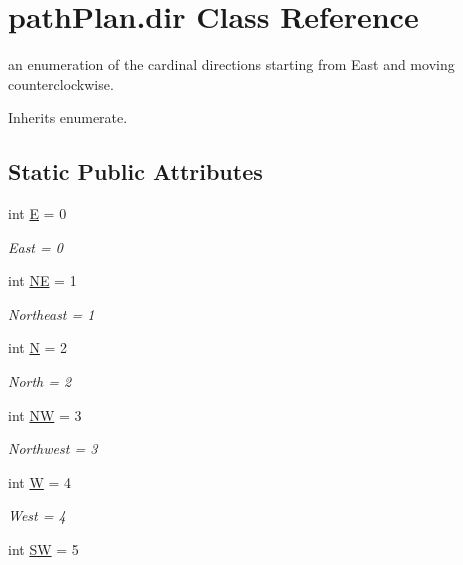 \hypertarget{classpath_plan_1_1dir}{}\section{path\+Plan.\+dir Class Reference}
\label{classpath_plan_1_1dir}


an enumeration of the cardinal directions starting from East and moving counterclockwise.  




Inherits enumerate.

\subsection*{Static Public Attributes}
\begin{DoxyCompactItemize}
\item 
int \mbox{\hyperlink{classpath_plan_1_1dir_ab95be1946ae2011628f9c023ac3c70b8}{E}} = 0
\begin{DoxyCompactList}\small\item\em East = 0 \end{DoxyCompactList}\item 
int \mbox{\hyperlink{classpath_plan_1_1dir_a93c91f045838b0f27107d060557335d6}{NE}} = 1
\begin{DoxyCompactList}\small\item\em Northeast = 1 \end{DoxyCompactList}\item 
int \mbox{\hyperlink{classpath_plan_1_1dir_adb5f0ffd07f156432f4932bef84c8860}{N}} = 2
\begin{DoxyCompactList}\small\item\em North = 2 \end{DoxyCompactList}\item 
int \mbox{\hyperlink{classpath_plan_1_1dir_abbaf07a2f6c31300763410df8ff8f222}{NW}} = 3
\begin{DoxyCompactList}\small\item\em Northwest = 3 \end{DoxyCompactList}\item 
int \mbox{\hyperlink{classpath_plan_1_1dir_a1446d6398e277ecd81c1386dd783b35b}{W}} = 4
\begin{DoxyCompactList}\small\item\em West = 4 \end{DoxyCompactList}\item 
int \mbox{\hyperlink{classpath_plan_1_1dir_a4be9ccf523408145c058bdde3d1ec95e}{SW}} = 5

\end{DoxyCompactItemize}
